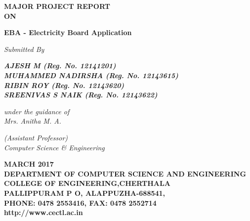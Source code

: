 \documentclass[12pt,a4paper,oneside]{report}
\begin{document}
\renewcommand\bibname{References}
\begin{titlepage}
\begin{center}
\Large{\textbf{MAJOR PROJECT REPORT}}\\
\textbf{ON}\\
\vspace{.05 in}
\begin{singlespace}
\LARGE{\textbf{EBA - Electricity Board Application }}\\
\end{singlespace}
\vspace{.1 in}
\Large{\textit{Submitted By }}\\
\begin{singlespace}
\Large{\textit{\textbf{AJESH M (Reg. No. 12141201)}}} \\
\Large{\textit{\textbf{MUHAMMED NADIRSHA (Reg. No. 12143615)}}} \\
\Large{\textit{\textbf{RIBIN ROY (Reg. No. 12143620)}}} \\
\Large{\textit{\textbf{SREENIVAS S NAIK (Reg. No. 12143622)}}} \\
\end{singlespace}
\Large{\textit{\textit{under the guidance of}}}\\
\Large{\textit{Mrs. Anitha M. A.}}\\
\begin{singlespace}
\Large{\textit{(Assistant Professor)}}\\
\Large{\textit{Computer Science \& Engineering}}
\end{singlespace}
\vspace{.05in}
\begin{figure}[h]
\begin{center}
\end{center}
\end{figure}
\begin{singlespace}
\large{\textbf{MARCH 2017}}\\
\vspace{.1in}
\large{\textbf{DEPARTMENT OF COMPUTER SCIENCE AND ENGINEERING\\COLLEGE OF ENGINEERING,CHERTHALA\\ PALLIPPURAM P O, ALAPPUZHA-688541, \\PHONE: 0478 2553416, FAX: 0478 2552714\\http://www.cectl.ac.in}}
\end{singlespace}
\end{center}
\end{titlepage}
\end{document}
